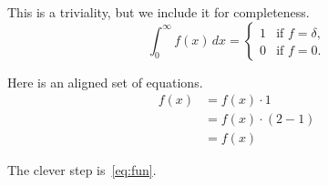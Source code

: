 This is a triviality, but we include it for completeness.
\begin{equation}
\int_0^\infty f(x) \, dx =
\begin{cases} 1 & \mbox{if $f=\delta$,} \\
0 & \mbox{if $f=0$.} \end{cases}
\end{equation}

Here is an aligned set of equations.
\begin{align}
f(x) &= f(x) \cdot 1 \\
     &= f(x) \cdot (2-1)\label{eq:fun}\\
     &= f(x)
\end{align}

The clever step is~\eqref{eq:fun}.
